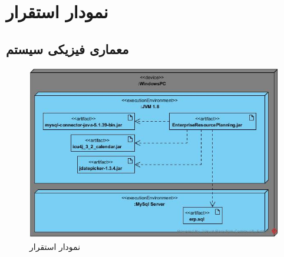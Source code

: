 \chapter{نمودار استقرار}


\section{معماری فیزیکی سیستم}

	\begin{figure}[H]
		\centering
		\includegraphics[scale=0.7]{img/deploy/DeploymentDiag}
		\caption{نمودار استقرار}
	\end{figure}